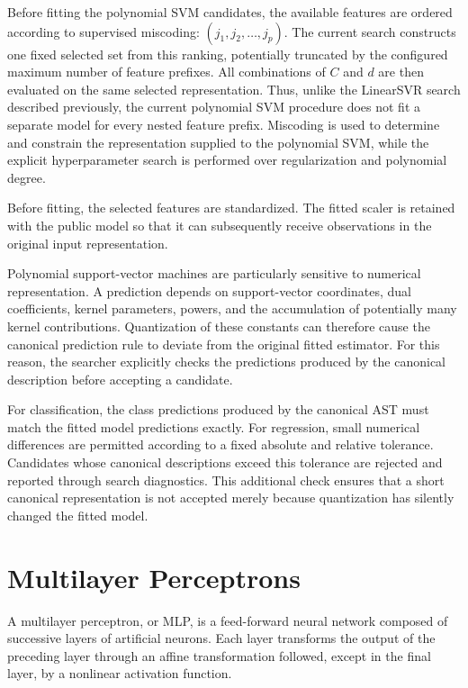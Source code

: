 Before fitting the polynomial SVM candidates, the available features are ordered according to supervised miscoding: $(j_1,j_2,\ldots,j_p)$. The current search constructs one fixed selected set from this ranking,
potentially truncated by the configured maximum number of feature prefixes. All combinations of $C$ and $d$ are then evaluated on the same selected representation. Thus, unlike the LinearSVR search described previously, the current polynomial SVM procedure does not fit a separate model for every nested feature prefix. Miscoding is used to determine and constrain the representation supplied to the polynomial SVM, while the explicit hyperparameter search is performed over regularization and polynomial degree.

Before fitting, the selected features are standardized. The fitted scaler is retained with the public model so that it can subsequently receive observations in the original input representation.

Polynomial support-vector machines are particularly sensitive to numerical representation. A prediction depends on support-vector coordinates, dual coefficients, kernel parameters, powers, and the accumulation of potentially
many kernel contributions. Quantization of these constants can therefore cause the canonical prediction rule to deviate from the original fitted estimator. For this reason, the searcher explicitly checks the predictions produced by the canonical description before accepting a candidate.

For classification, the class predictions produced by the canonical AST must match the fitted model predictions exactly. For regression, small numerical differences are permitted according to a fixed absolute and relative tolerance. Candidates whose canonical descriptions exceed this tolerance are rejected and reported through search diagnostics. This additional check ensures that a short canonical representation is not accepted merely because quantization has silently changed the fitted model.


%
%

\section{Multilayer Perceptrons}
\label{subsec:automl_mlp}

A multilayer perceptron, or MLP, is a feed-forward neural network composed of successive layers of artificial neurons. Each layer transforms the output of the preceding layer through an affine transformation followed, except in the final layer, by a nonlinear activation function.

